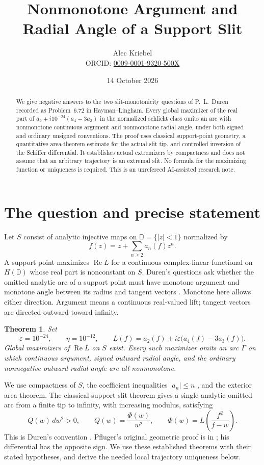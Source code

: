 \documentclass[10pt]{article}
\title{Nonmonotone Argument and Radial Angle of a Support Slit}
\author{Alec Kriebel\\
 \small ORCID: \href{https://orcid.org/0009-0001-9320-500X}{0009-0001-9320-500X}}
\date{14 October 2026}
\newtheorem{theorem}{Theorem}
\newcommand{\eps}{\varepsilon}
\newcommand{\D}{\mathbb D}
\newcommand{\Rea}{\operatorname{Re}}
\begin{document}
\maketitle
\begin{abstract}
We give negative answers to the two slit-monotonicity questions of
P.~L.~Duren recorded as Problem~6.72 in Hayman--Lingham.
Every global maximizer of the real part of
\(a_2+i10^{-24}(a_4-3a_3)\) in the normalized schlicht class
omits an arc with nonmonotone continuous argument and nonmonotone radial
angle, under both signed and ordinary unsigned conventions.
The proof uses classical support-point geometry, a quantitative area-theorem
estimate for the actual slit tip, and controlled inversion of the
Schiffer differential. It establishes actual extremizers by compactness
and does not assume that an arbitrary trajectory is an extremal slit.
No formula for the maximizing function or uniqueness is required.
This is an unrefereed AI-assisted research note.
\end{abstract}

\section{The question and precise statement}
Let \(S\) consist of analytic injective maps on \(\D=\{|z|<1\}\)
normalized by
\[
                 f(z)=z+\sum_{n\ge2}a_n(f)z^n.
\]
A support point maximizes \(\Rea L\) for a continuous complex-linear
functional on \(H(\D)\) whose real part is nonconstant on \(S\).
Duren's questions ask whether the omitted analytic arc of a support
point must have monotone argument and monotone angle between its radius
and tangent vectors \cite[Problem 6.72]{HL}. Monotone here allows either
direction. Argument means a continuous real-valued lift; tangent vectors
are directed outward toward infinity.

\begin{theorem}\label{main}
Set
\[
 \eps=10^{-24},\qquad \eta=10^{-12},\qquad
 L(f)=a_2(f)+i\eps\bigl(a_4(f)-3a_3(f)\bigr).
\]
Global maximizers of \(\Rea L\) on \(S\) exist. Every such maximizer
omits an arc \(\Gamma\) on which continuous argument, signed outward
radial angle, and the ordinary nonnegative outward radial angle
are all nonmonotone.
\end{theorem}

We use compactness of \(S\), the coefficient inequalities
\(|a_n|\le n\) \cite{deBranges}, and the exterior area theorem.
The classical support-slit theorem gives a single analytic omitted arc
from a finite tip to infinity, with increasing modulus, satisfying
\begin{equation}\label{schiffer}
 Q(w)\,dw^2>0,\qquad
 Q(w)=\frac{\Phi(w)}{w^2},\qquad
 \Phi(w)=L\left(\frac{f^2}{f-w}\right).
\end{equation}
This is Duren's convention \cite[pp.352--355]{Duren}.
Pfluger's original geometric proof is in
\cite[\S\S4.1--4.5]{Pfluger}; his differential has the opposite sign.
We use these established theorems with their stated hypotheses, and
derive the needed local trajectory uniqueness below.
\end{document}
